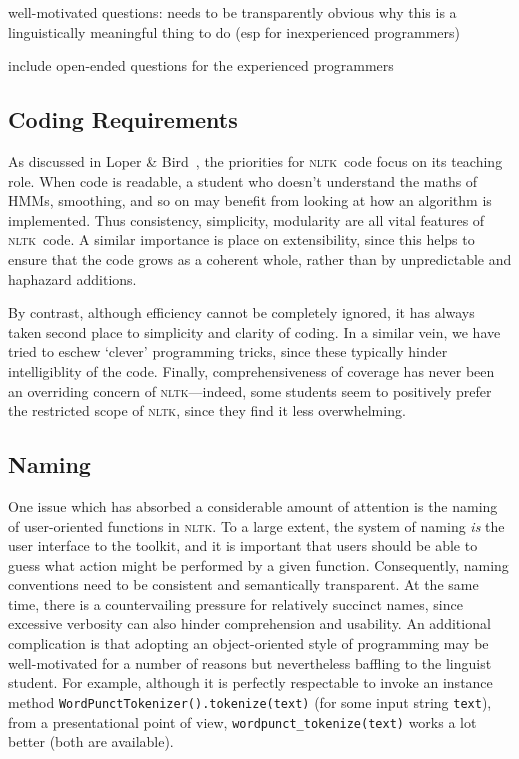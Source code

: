 \documentclass[11pt]{article}
\newcommand{\NLTK}{\textsc{nltk}}
\newcommand{\code}[1]{\texttt{\small #1}}
\begin{document}
well-motivated questions: needs to be transparently obvious why this is a linguistically meaningful thing to do
(esp for inexperienced programmers)

include open-ended questions for the experienced programmers

\subsection{Coding Requirements}

As discussed in Loper \& Bird~, the priorities for \NLTK\ code
focus on its teaching role. When code is readable, a student who
doesn't understand the maths of HMMs, smoothing, and so on may benefit
from looking at how an algorithm is implemented. Thus consistency,
simplicity, modularity are all vital features of \NLTK\ code. A
similar importance is place on extensibility, since this helps to
ensure that the code grows as a coherent whole, rather than by
unpredictable and haphazard additions.  

By contrast, although efficiency cannot be completely ignored, it has
always taken second place to simplicity and clarity of coding. In a
similar vein, we have tried to eschew `clever' programming tricks,
since these typically hinder intelligiblity of the code.  Finally,
comprehensiveness of coverage has never been an overriding concern of
\NLTK---indeed, some students seem to positively prefer the restricted
scope of \NLTK, since they find it less overwhelming. 


\subsection{Naming}

One issue which has absorbed a considerable amount of attention is the
naming of user-oriented functions in \NLTK. To a large extent, the
system of naming \emph{is} the user interface to the toolkit, and it is
important that users should be able to guess what action might be
performed by a given function. Consequently, naming conventions need
to be consistent and semantically transparent. At the same time, there is a
countervailing pressure for relatively succinct names, since excessive verbosity
can also hinder comprehension and usability. An additional
complication is that adopting an object-oriented style of programming
may be well-motivated for a number of reasons but nevertheless
baffling to the linguist student. For example, although it is
perfectly respectable to invoke an instance method
\code{WordPunctTokenizer().tokenize(text)} (for some input
string \code{text}), from a presentational point of view, 
\code{wordpunct\_tokenize(text)} works a lot better
(both are available).
\end{document}
